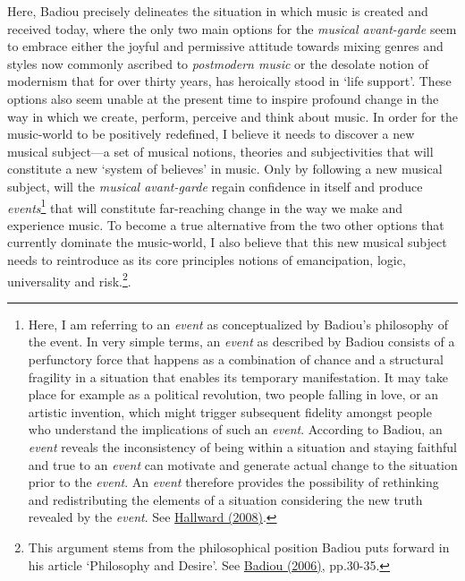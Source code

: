 Here, Badiou precisely delineates the situation in which music is created and received today, where the only two main options for the \emph{musical avant-garde} seem to embrace either the joyful and permissive attitude towards mixing genres and styles now commonly ascribed to \emph{postmodern music} or the desolate notion of modernism that for over thirty years, has heroically stood in `life support'. These options also seem unable at the present time to inspire profound change in the way in which we create, perform, perceive and think about music. In order for the music-world to be positively redefined, I believe it needs to discover a new musical subject---a set of musical notions, theories and subjectivities that will constitute a new `system of believes' in music. Only by following a new musical subject, will the \emph{musical avant-garde} regain confidence in itself and produce \emph{events}\footnote{Here, I am referring to an \emph{event} as conceptualized by  Badiou's philosophy of the event. In very simple terms, an \emph{event} as described by Badiou consists of a perfunctory force that happens as a combination of chance and a structural fragility in a situation that enables its temporary manifestation. It may take place for example as a political revolution, two people falling in love, or an artistic invention, which might trigger subsequent fidelity amongst people who understand the implications of such an \emph{event}. According to Badiou, an \emph{event} reveals the inconsistency of being within a situation and staying faithful and true to an \emph{event} can motivate and generate actual change to the situation prior to the \emph{event}. An \emph{event} therefore provides the possibility of rethinking and redistributing the elements of a situation considering the new truth revealed by the \emph{event}. See \hyperlink{hallward}{Hallward (2008)}.} that will constitute far-reaching change in the way we make and experience music. To become a true alternative from the two other options that currently dominate the music-world, I also believe that this new musical subject needs to reintroduce as its core principles notions of emancipation, logic, universality and risk.\footnote{This argument stems from the philosophical position Badiou puts forward in his article `Philosophy and Desire'. See \hyperlink{infthought}{Badiou (2006)}, pp.30-35.}.

